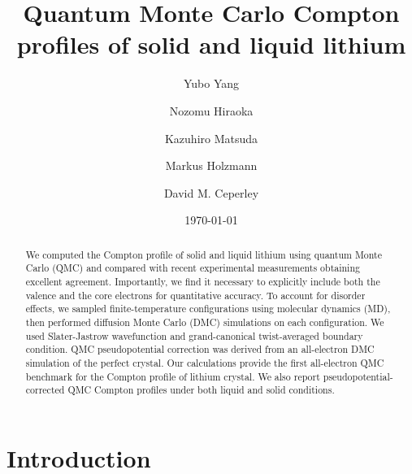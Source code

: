 \documentclass[aps,prb,showpacs,preprintnumbers,amsmath,amssymb,superscriptaddress,twocolumn]{revtex4}
\begin{document}
\title{Quantum Monte Carlo Compton profiles of solid and liquid lithium}
\author{Yubo Yang}
\author{Nozomu Hiraoka}
\author{Kazuhiro Matsuda}
\author{Markus Holzmann}
\author{David M. Ceperley}
\date{\today}
\begin{abstract}
We computed the Compton profile of solid and liquid lithium using quantum Monte Carlo (QMC) and compared with recent experimental measurements obtaining excellent agreement. Importantly, we find it necessary to explicitly include both the valence and the core electrons for quantitative accuracy. To account for disorder effects, we sampled finite-temperature configurations using molecular dynamics (MD), then performed diffusion Monte Carlo (DMC) simulations on each configuration. We used Slater-Jastrow wavefunction and grand-canonical twist-averaged boundary condition. QMC pseudopotential correction was derived from an all-electron DMC simulation of the perfect crystal. Our calculations provide the first all-electron QMC benchmark for the Compton profile of lithium crystal. We also report pseudopotential-corrected QMC Compton profiles under both liquid and solid conditions.
\end{abstract}
\pacs{}
\maketitle

\section{Introduction} \label{sec:intro}
\end{document}
